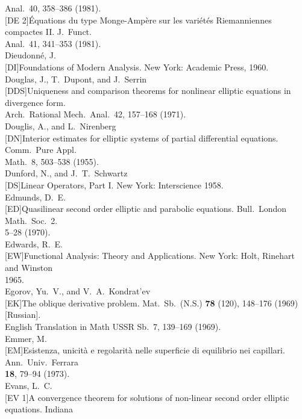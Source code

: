 \begin{flushleft}
Anal.\ 40, 358--386 (1981).\\
{}[DE 2]\quad \'Equations du type Monge-Amp\`ere sur les vari\'et\'es Riemanniennes compactes II. J.\ Funct.\\
Anal.\ 41, 341--353 (1981).\\[1ex]
Dieudonn\'e, J.\\
{}[DI]\quad Foundations of Modern Analysis. New York: Academic Press, 1960.\\[1ex]
Douglas, J., T.\ Dupont, and J.\ Serrin\\
{}[DDS]\quad Uniqueness and comparison theorems for nonlinear elliptic equations in divergence form.\\
Arch.\ Rational Mech.\ Anal.\ 42, 157--168 (1971).\\[1ex]
Douglis, A., and L.\ Nirenberg\\
{}[DN]\quad Interior estimates for elliptic systems of partial differential equations. Comm.\ Pure Appl.\\
Math.\ 8, 503--538 (1955).\\[1ex]
Dunford, N., and J.\ T.\ Schwartz\\
{}[DS]\quad Linear Operators, Part I. New York: Interscience 1958.\\[1ex]
Edmunds, D.\ E.\\
{}[ED]\quad Quasilinear second order elliptic and parabolic equations. Bull.\ London Math.\ Soc.\ 2.\\
5--28 (1970).\\[1ex]
Edwards, R.\ E.\\
{}[EW]\quad Functional Analysis: Theory and Applications. New York: Holt, Rinehart and Winston\\
1965.\\[1ex]
Egorov, Yu.\ V., and V.\ A.\ Kondrat'ev\\
{}[EK]\quad The oblique derivative problem. Mat.\ Sb.\ (N.S.) \textbf{78} (120), 148--176 (1969) [Russian].\\
English Translation in Math USSR Sb.\ 7, 139--169 (1969).\\[1ex]
Emmer, M.\\
{}[EM]\quad Esistenza, unicit\`a e regolarit\`a nelle superficie di equilibrio nei capillari. Ann.\ Univ.\ Ferrara\\
\textbf{18}, 79--94 (1973).\\[1ex]
Evans, L.\ C.\\
{}[EV 1]\quad A convergence theorem for solutions of non-linear second order elliptic equations. Indiana\\

\end{flushleft}
